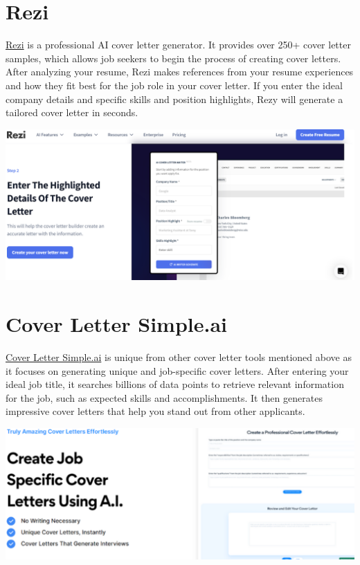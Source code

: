 \documentclass[
]{book}
\begin{document}
\hypertarget{rezi}{%
\section{Rezi}\label{rezi}}

\href{https://www.rezi.ai/}{Rezi} is a professional AI cover letter generator. It provides over 250+ cover letter samples, which allows job seekers to begin the process of creating cover letters. After analyzing your resume, Rezi makes references from your resume experiences and how they fit best for the job role in your cover letter. If you enter the ideal company details and specific skills and position highlights, Rezy will generate a tailored cover letter in seconds.~

\includegraphics[width=5.5in,height=\textheight]{Rezi pic.png}

\hypertarget{cover-letter-simple.ai}{%
\section{Cover Letter Simple.ai}\label{cover-letter-simple.ai}}

\href{https://coverlettersimple.ai/}{Cover Letter Simple.ai} is unique from other cover letter tools mentioned above as it focuses on generating unique and job-specific cover letters. After entering your ideal job title, it searches billions of data points to retrieve relevant information for the job, such as expected skills and accomplishments. It then generates impressive cover letters that help you stand out from other applicants.

\includegraphics[width=6.80208in,height=\textheight]{coverlettsimpleai pic.png}
\end{document}
